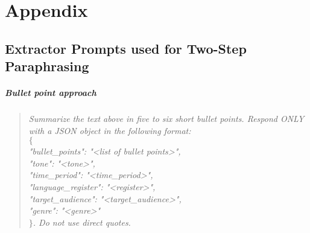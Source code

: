 \appendix
\chapter{Appendix}
\label{ch:appendix}


\section{Extractor Prompts used for Two-Step Paraphrasing}
\label{app:extractor_prompts}
\paragraph{Bullet point approach}
\begin{quote}
\textit{
Summarize the text above in five to six short bullet points. 
Respond ONLY with a JSON object in the following format: \\
$\{$ \\
\hspace{1em}"bullet\_points": "<list of bullet points>", \\
\hspace{1em}"tone": "<tone>", \\
\hspace{1em}"time\_period": "<time\_period>", \\
\hspace{1em}"language\_register": "<register>", \\
\hspace{1em}"target\_audience": "<target\_audience>", \\
\hspace{1em}"genre": "<genre>" \\
$\}$. 
Do not use direct quotes.
}
\end{quote}


